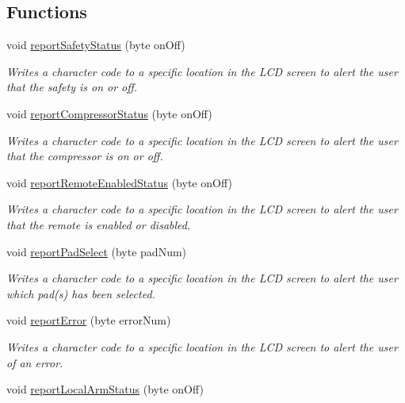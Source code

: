 \subsection*{Functions}
\begin{DoxyCompactItemize}
\item 
void \hyperlink{masterPanel_8ino_a47f529525de58eb550617cd09e49ecfe}{report\+Safety\+Status} (byte on\+Off)
\begin{DoxyCompactList}\small\item\em Writes a character code to a specific location in the L\+CD screen to alert the user that the safety is on or off. \end{DoxyCompactList}\item 
void \hyperlink{masterPanel_8ino_a949150efa4f2be80075eba8aca9aeaf4}{report\+Compressor\+Status} (byte on\+Off)
\begin{DoxyCompactList}\small\item\em Writes a character code to a specific location in the L\+CD screen to alert the user that the compressor is on or off. \end{DoxyCompactList}\item 
void \hyperlink{masterPanel_8ino_a0407b0e2d92c33214c76f4fc2e307904}{report\+Remote\+Enabled\+Status} (byte on\+Off)
\begin{DoxyCompactList}\small\item\em Writes a character code to a specific location in the L\+CD screen to alert the user that the remote is enabled or disabled. \end{DoxyCompactList}\item 
void \hyperlink{masterPanel_8ino_a0d61356b57e8ee0cba9a3fb5053f94a1}{report\+Pad\+Select} (byte pad\+Num)
\begin{DoxyCompactList}\small\item\em Writes a character code to a specific location in the L\+CD screen to alert the user which pad(s) has been selected. \end{DoxyCompactList}\item 
void \hyperlink{masterPanel_8ino_a44d9c6f1f09925b57bb24c085facec8b}{report\+Error} (byte error\+Num)
\begin{DoxyCompactList}\small\item\em Writes a character code to a specific location in the L\+CD screen to alert the user of an error. \end{DoxyCompactList}\item 
void \hyperlink{masterPanel_8ino_a83738b455d61681c882d51672b269312}{report\+Local\+Arm\+Status} (byte on\+Off)

\end{DoxyCompactItemize}
